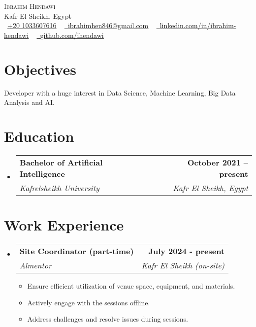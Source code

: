 \documentclass[letterpaper,11pt]{article}
\makeatletter
\newcommand{\resumeItem}[1]{
  \item\small{
    {#1 \vspace{-2pt}}
  }
}
\newcommand{\resumeSubheading}[4]{
  \vspace{-2pt}\item
    \begin{tabular*}{1.0\textwidth}[t]{l@{\extracolsep{\fill}}r}
      \textbf{#1} & \textbf{\small #2} \\
      \textit{\small#3} & \textit{\small #4} \\
    \end{tabular*}\vspace{-7pt}
}
\newcommand{\resumeSubHeadingListStart}{\begin{itemize}[leftmargin=0.0in, label={}]}
\newcommand{\resumeSubHeadingListEnd}{\end{itemize}}
\newcommand{\resumeItemListStart}{\begin{itemize}}
\newcommand{\resumeItemListEnd}{\end{itemize}\vspace{-5pt}}
\makeatother
\begin{document}
\begin{center}


  {\Huge \scshape Ibrahim Hendawi} \\ \vspace{1pt}
  Kafr El Sheikh, Egypt \\ \vspace{1pt}
  \small
  {\raisebox{-0.1\height}
  \faPhone\ 
  \underline{+20 1033607616}} ~ 
  \href{mialto:ibrahimhen846@gmail.com}
  {\raisebox{-0.2\height}
  \faEnvelope\
  \underline{ibrahimhen846@gmail.com}} ~
  \href{https://www.linkedin.com/in/ibrahim-hendawi-7a5655217/}
  {\raisebox{-0.2\height}
  \faLinkedin\ 
  \underline{linkedin.com/in/ibrahim-hendawi}}  ~
  \href{https://github.com/ihendawi}
  {\raisebox{-0.2\height}
  \faGithub\ 
  \underline{github.com/ihendawi}}
  \vspace{-8pt}


\end{center}


\section{Objectives}
Developer with a huge interest in Data Science, Machine Learning, Big Data Analysis and AI.


\section{Education}
  \resumeSubHeadingListStart
    \resumeSubheading
      {Bachelor of Artificial Intelligence}{October 2021 -- present}
      {Kafrelsheikh University}{Kafr El Sheikh, Egypt}
      
  \resumeSubHeadingListEnd
  \vspace{-13pt}


\section{Work Experience}
  \resumeSubHeadingListStart
    \resumeSubheading
      {Site Coordinator (part-time)}{July 2024 - present}
      {Almentor}{Kafr El Sheikh (on-site)}
      \resumeItemListStart
        \resumeItem{
          Ensure efficient utilization of venue space, equipment, and materials.
        }
        \resumeItem{
          Actively engage with the sessions offline.
        }
        \resumeItem{
          Address challenges and resolve issues during sessions.
        }
      \resumeItemListEnd
  \resumeSubHeadingListEnd
\end{document}
